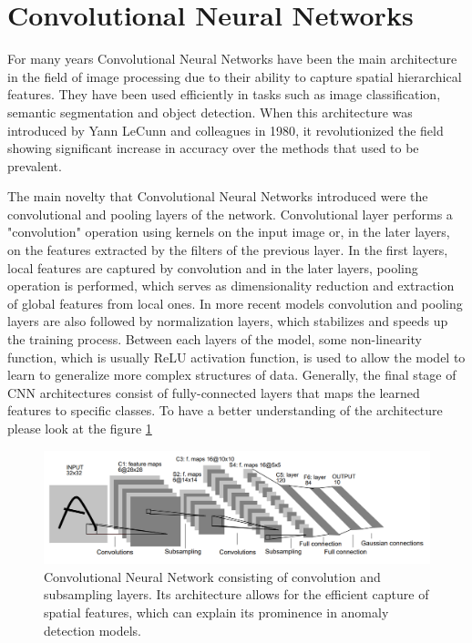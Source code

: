 \section{Convolutional Neural Networks}
\label{cnn}
For many years Convolutional Neural Networks have been the main architecture in the field of image processing due to their ability to capture spatial hierarchical features\cite{cnn_survey}. They have been used efficiently in tasks such as image classification, semantic segmentation and object detection. When this architecture was introduced by Yann LeCunn and colleagues in 1980\cite{lenet}, it revolutionized the field showing significant increase in accuracy over the methods that used to be prevalent.

The main novelty that Convolutional Neural Networks introduced were the convolutional and pooling layers of the network\cite{lenet}. Convolutional layer performs a "convolution" operation using kernels on the input image or, in the later layers, on the features extracted by the filters of the previous layer\cite{lenet}. In the first layers, local features are captured by convolution and in the later layers, pooling operation is performed, which serves as dimensionality reduction and extraction of global features from local ones. In more recent models convolution and pooling layers are also followed by normalization layers, which stabilizes and speeds up the training process\cite{batchnorm}. Between each layers of the model, some non-linearity function, which is usually ReLU activation function, is used to allow the model to learn to generalize more complex structures of data. Generally, the final stage of CNN\cite{lenet} architectures consist of fully-connected layers that maps the learned features to specific classes. To have a better understanding of the architecture please look at the figure \ref{fig:cnn}

\begin{figure}[t]
	\begin{center}
		\includegraphics[width=1.0\linewidth]{Chapter_2/cnn.png}
	\end{center}
	\caption{Convolutional Neural Network consisting of convolution and subsampling layers. Its architecture allows for the efficient capture of spatial features, which can explain its prominence in anomaly detection models.\cite{lenet}}
	\label{fig:cnn}
\end{figure}


